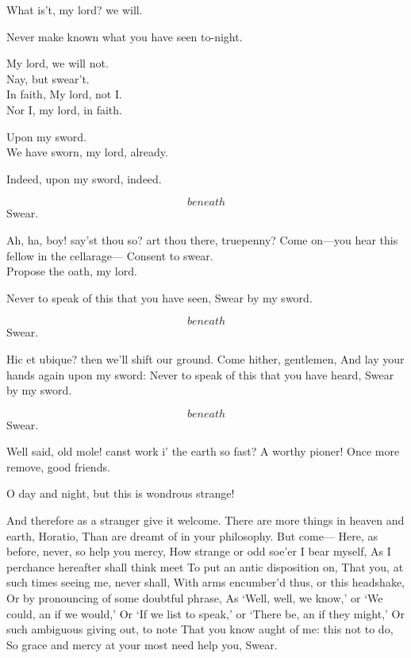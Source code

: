 \documentclass[11pt]{book}
\begin{document}
\6	What is't, my lord? we will.

\1	Never make known what you have seen to-night.


   My lord, we will not.\\[l not.]

\1	Nay, but swear't. \\

\6	In faith,
	My lord, not I. \\

	                  Nor I, my lord, in faith.

\1	Upon my sword. \\

	                  We have sworn, my lord, already.

\1	Indeed, upon my sword, indeed.

 \[beneath\]  Swear.

\1	Ah, ha, boy! say'st thou so? art thou there, truepenny?
	Come on---you hear this fellow in the cellarage---
	Consent to swear. \\

\6	                  Propose the oath, my lord.

\1	Never to speak of this that you have seen,
	Swear by my sword.

 \[beneath\]  Swear.

\1	Hic et ubique? then we'll shift our ground.
	Come hither, gentlemen,
	And lay your hands again upon my sword:
	Never to speak of this that you have heard,
	Swear by my sword.

 \[beneath\]  Swear.

\1	Well said, old mole! canst work i' the earth so fast?
	A worthy pioner! Once more remove, good friends.

\6	O day and night, but this is wondrous strange!

\1	And therefore as a stranger give it welcome.
	There are more things in heaven and earth, Horatio,
	Than are dreamt of in your philosophy.
   But come---
	Here, as before, never, so help you mercy,
	How strange or odd soe'er I bear myself,
	As I perchance hereafter shall think meet
	To put an antic disposition on,
	That you, at such times seeing me, never shall,
	With arms encumber'd thus, or this headshake,
	Or by pronouncing of some doubtful phrase,
	As `Well, well, we know,' or `We could, an if we would,'
	Or `If we list to speak,' or `There be, an if they might,'
	Or such ambiguous giving out, to note
	That you know aught of me: this not to do,
	So grace and mercy at your most need help you, Swear.
\end{document}
